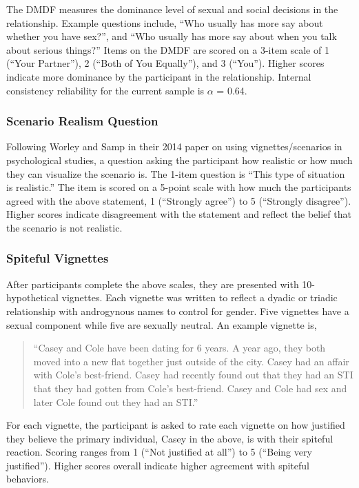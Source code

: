 \documentclass[
  donotrepeattitle,doc, 12pt, a4paper,floatsintext]{apa7}
\begin{document}
The DMDF measures the dominance level of sexual and social decisions in the relationship. Example questions include, ``Who usually has more say about whether you have sex?'', and ``Who usually has more say about when you talk about serious things?'' Items on the DMDF are scored on a 3-item scale of 1 (``Your Partner''), 2 (``Both of You Equally''), and 3 (``You''). Higher scores indicate more dominance by the participant in the relationship. Internal consistency reliability for the current sample is \(\alpha\) = 0.64.

\hypertarget{scenario-realism-question}{%
\subsubsection{Scenario Realism Question}\label{scenario-realism-question}}

Following Worley and Samp in their 2014 paper on using vignettes/scenarios in psychological studies, a question asking the participant how realistic or how much they can visualize the scenario is. The 1-item question is ``This type of situation is realistic.'' The item is scored on a 5-point scale with how much the participants agreed with the above statement, 1 (``Strongly agree'') to 5 (``Strongly disagree''). Higher scores indicate disagreement with the statement and reflect the belief that the scenario is not realistic.

\hypertarget{spiteful-vignettes}{%
\subsubsection{Spiteful Vignettes}\label{spiteful-vignettes}}

After participants complete the above scales, they are presented with 10-hypothetical vignettes. Each vignette was written to reflect a dyadic or triadic relationship with androgynous names to control for gender. Five vignettes have a sexual component while five are sexually neutral. An example vignette is,

\begin{quote}
``Casey and Cole have been dating for 6 years. A year ago, they both moved into a new flat together just outside of the city. Casey had an affair with Cole's best-friend. Casey had recently found out that they had an STI that they had gotten from Cole's best-friend. Casey and Cole had sex and later Cole found out they had an STI.''
\end{quote}

For each vignette, the participant is asked to rate each vignette on how justified they believe the primary individual, Casey in the above, is with their spiteful reaction. Scoring ranges from 1 (``Not justified at all'') to 5 (``Being very justified''). Higher scores overall indicate higher agreement with spiteful behaviors.
\end{document}
